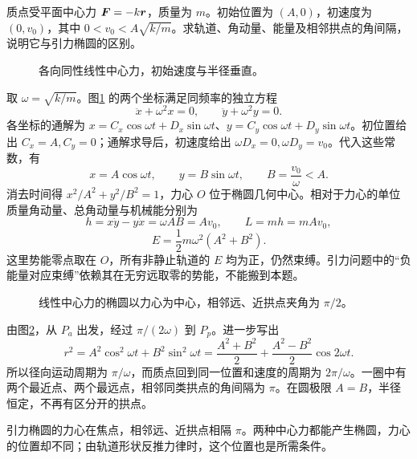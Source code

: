 \begin{example}[力心在椭圆中心的轨道]\label{sup8:problem-example-9}\label{sup8:ex:d8-e9}
质点受平面中心力 $\bm{F}=-k\bm{r}$，质量为 $m$。初始位置为 $(A,0)$，初速度为 $(0,v_0)$，其中 $0<v_0<A\sqrt{k/m}$。求轨道、角动量、能量及相邻拱点的角间隔，说明它与引力椭圆的区别。
\end{example}
\begin{figure}[H]\centering
{}
\caption{各向同性线性中心力，初始速度与半径垂直。}\label{sup8:fig:d8-e9-q}
\end{figure}
\begin{solution}
取 $\omega=\sqrt{k/m}$。图\ref{sup8:fig:d8-e9-q} 的两个坐标满足同频率的独立方程
\[
 \ddot x+\omega^2x=0,\qquad\ddot y+\omega^2y=0.
\]
各坐标的通解为 $x=C_x\cos\omega t+D_x\sin\omega t$、$y=C_y\cos\omega t+D_y\sin\omega t$。初位置给出 $C_x=A,C_y=0$；通解求导后，初速度给出 $\omega D_x=0,\omega D_y=v_0$。代入这些常数，有
\[
 x=A\cos\omega t,\qquad y=B\sin\omega t,\qquad B=\frac{v_0}{\omega}<A.
\]
消去时间得 $x^2/A^2+y^2/B^2=1$，力心 $O$ 位于椭圆几何中心。相对于力心的单位质量角动量、总角动量与机械能分别为
\[
 h=x\dot y-y\dot x=\omega AB=Av_0,\qquad L=mh=mAv_0,
\]
\[
 E=\frac12m\omega^2(A^2+B^2).
\]
这里势能零点取在 $O$，所有非静止轨道的 $E$ 均为正，仍然束缚。引力问题中的“负能量对应束缚”依赖其在无穷远取零的势能，不能搬到本题。
\begin{figure}[H]\centering
{}
\caption{线性中心力的椭圆以力心为中心，相邻远、近拱点夹角为 $\pi/2$。}\label{sup8:fig:d8-e9-s}
\end{figure}
由图\ref{sup8:fig:d8-e9-s}，从 $P_a$ 出发，经过 $\pi/(2\omega)$ 到 $P_p$。进一步写出
\[
 r^2=A^2\cos^2\omega t+B^2\sin^2\omega t
 =\frac{A^2+B^2}2+\frac{A^2-B^2}2\cos2\omega t.
\]
所以径向运动周期为 $\pi/\omega$，而质点回到同一位置和速度的周期为 $2\pi/\omega$。一圈中有两个最近点、两个最远点，相邻同类拱点的角间隔为 $\pi$。在圆极限 $A=B$，半径恒定，不再有区分开的拱点。

引力椭圆的力心在焦点，相邻远、近拱点相隔 $\pi$。两种中心力都能产生椭圆，力心的位置却不同；由轨道形状反推力律时，这个位置也是所需条件。
\end{solution}



